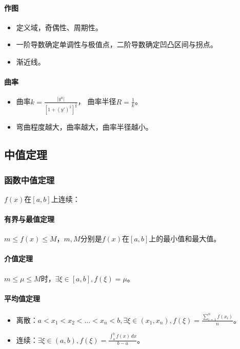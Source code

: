 \documentclass[
12pt, %
a4paper, 
oneside, %
headinclude,footinclude, %
]{scrartcl}
\begin{document}
\paragraph{作图}
\begin{itemize}
\item 定义域，奇偶性、周期性。
\item 一阶导数确定单调性与极值点，二阶导数确定凹凸区间与拐点。
\item 渐近线。
\end{itemize}
\paragraph{曲率}
\begin{itemize}
\item 曲率$ k = \frac{|y^n|}{[1 + (y')^2]^{\frac{3}{2}}} $，
曲率半径$ R = \frac{1}{k} $。
\item 弯曲程度越大，曲率越大，曲率半径越小。
\end{itemize}
\subsection{中值定理}
\subsubsection{函数中值定理}
$ f(x) $在$ [a, b] $上连续：
\paragraph{有界与最值定理}
$ m \leq f(x) \leq M $，$ m,M $分别是$ f(x) $在$ [a, b] $上的最小值和最大值。
\paragraph{介值定理}
$ m \leq \mu \leq M $时，$ \exists \xi \in [a, b], f(\xi) = \mu $。
\paragraph{平均值定理}
\begin{itemize}
\item 离散：$ a < x_1 < x_2 < \dots < x_n < b, \exists \xi \in (x_1, x_n), f(\xi) = \frac{\sum_{i = 1}^n f(x_i)}{n} $。
\item 连续：$ \exists \xi \in (a, b), f(\xi) = \frac{\int_{a}^{b} f(x)\,dx }{b - a} $。
\end{itemize}
\end{document}
